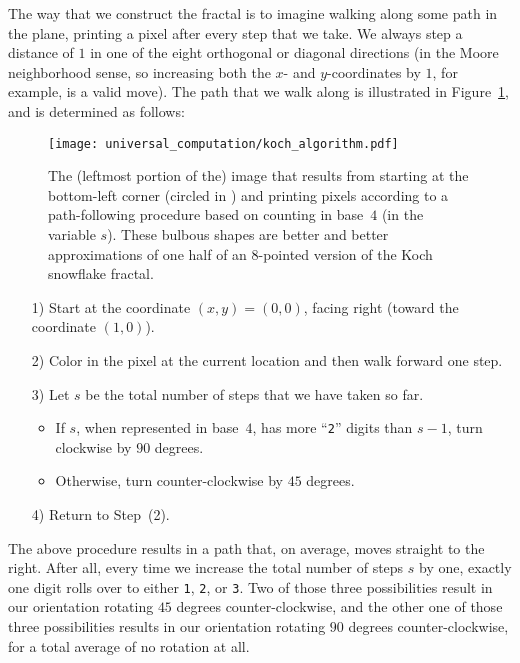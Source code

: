 The way that we construct the fractal is to imagine walking along some path in the plane, printing a pixel after every step that we take. We always step a distance of $1$ in one of the eight orthogonal or diagonal directions (in the Moore neighborhood  sense, so increasing both the $x$- and $y$-coordinates by $1$, for example, is a valid move). The path that we walk along is illustrated in Figure~\ref{fig:koch_algorithm}, and is determined as follows:\smallskip

\begin{figure}[!htb]
	\centering
	\texttt{[image: universal\_computation/koch\_algorithm.pdf]}
	\caption{The (leftmost portion of the) image that results from starting at the bottom-left corner (circled in ) and printing pixels according to a path-following procedure based on counting in base~$4$ (in the variable $s$). These bulbous shapes are better and better approximations of one half of an 8-pointed version of the Koch snowflake fractal.}\label{fig:koch_algorithm}
\end{figure}

\begin{itemize}
	\item[1)] Start at the coordinate $(x,y) = (0,0)$, facing right (toward the coordinate $(1,0)$).\smallskip
	
	\item[2)] Color in the pixel at the current location and then walk forward one step.\smallskip
	
	\item[3)] Let $s$ be the total number of steps that we have taken so far.\smallskip
	\begin{itemize}
		\item If $s$, when represented in base~$4$, has more ``\texttt{2}'' digits than $s-1$, turn clockwise by $90$ degrees.\smallskip
		
		\item Otherwise, turn counter-clockwise by $45$ degrees.\smallskip
	\end{itemize}
	
	\item[4)] Return to Step~(2).\smallskip
\end{itemize}

The above procedure results in a path that, on average, moves straight to the right. After all, every time we increase the total number of steps $s$ by one, exactly one digit rolls over to either \texttt{1}, \texttt{2}, or \texttt{3}. Two of those three possibilities result in our orientation rotating $45$ degrees counter-clockwise, and the other one of those three possibilities results in our orientation rotating $90$ degrees counter-clockwise, for a total average of no rotation at all.

